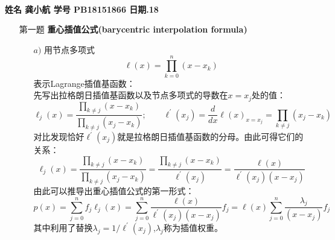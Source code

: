 \documentclass[12pt,a4paper,utf8]{ctexart}
\begin{document}



\begin{center}

   \begin{spacing}{2.0}%
      \textbf{}\\
   \end{spacing}

\textbf{姓名 \quad 龚小航 \qquad  学号 \quad PB18151866  \qquad 日期.18}\\
\end{center}

\begin{enumerate}
\item[第一题] \textbf{重心插值公式(barycentric interpolation formula)}  

  \begin{enumerate}
    \item[$a)$] 用节点多项式
        \begin{equation}
           \ell(x)=\prod_{k=0}^n(x-x_{k})
        \end{equation}
    表示Lagrange插值基函数：\\
    先写出拉格朗日插值基函数以及节点多项式的导数在$x=x_j$处的值：
        \begin{equation}
           \ell_{j}(x)=\frac{\prod_{k \neq j}\left(x-x_{k}\right)}{\prod_{k \neq j}\left(x_{j}-x_{k}\right)} ;\label{cardinal}
           \quad  \quad \ell^{'}(x_j)=\frac{d}{dx}\ell (x)_{x=x_{j}}=\prod_{k \neq j}\left(x_{j}-x_{k}\right)
        \end{equation}
    对比发现恰好$\ell^{'}(x_j)$就是拉格朗日插值基函数的分母。由此可得它们的关系：
        \begin{equation}
            \ell_{j}(x)=\frac{\prod_{k \neq j}\left(x-x_{k}\right)}{\prod_{k \neq j}\left(x_{j}-x_{k}\right)} 
            =\frac{\prod_{k \neq j}\left(x-x_{k}\right)}{\ell^{'}(x_j)}
            =\frac{\ell(x)}{\ell^{'}(x_j)(x-x_{j})}
        \end{equation}
    由此可以推导出重心插值公式的第一形式：
        \begin{equation}
            p(x) = \sum_{j=0}^{n} f_j \ell_j(x)
            =\sum_{j=0}^{n} \frac{\ell(x)}{\ell^{'}(x_j)(x-x_{j})}f_j
            =\ell(x)\sum_{j=0}^{n} \frac{\lambda_{j}}{(x-x_{j})}f_j
        \end{equation}
    其中利用了替换$\lambda_{j}=1/\ell^{'}(x_j)$,$\lambda_{j}$称为插值权重。
    

\end{enumerate}
\end{enumerate}
\end{document}
